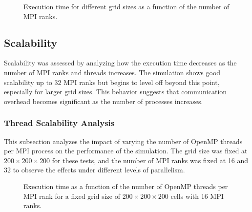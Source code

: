 \documentclass[conference,compsoc]{IEEEtran}
\begin{document}
\begin{figure}
    \centering
    \caption{Execution time for different grid sizes as a function of the number of MPI ranks.}
    \label{fig:exec_time}
\end{figure}

\subsection{Scalability}
Scalability was assessed by analyzing how the execution time decreases as the number of MPI ranks and threads increases. The simulation shows good scalability up to 32 MPI ranks but begins to level off beyond this point, especially for larger grid sizes. This behavior suggests that communication overhead becomes significant as the number of processes increases.

\subsubsection{Thread Scalability Analysis}

This subsection analyzes the impact of varying the number of OpenMP threads per MPI process on the performance of the simulation. The grid size was fixed at $200 \times 200 \times 200$ for these tests, and the number of MPI ranks was fixed at 16 and 32 to observe the effects under different levels of parallelism.

\begin{figure}[htbp]
    \centering
    \caption{Execution time as a function of the number of OpenMP threads per MPI rank for a fixed grid size of $200 \times 200 \times 200$ cells with 16 MPI ranks.}
    \label{fig:threads_16}
\end{figure}
\end{document}
